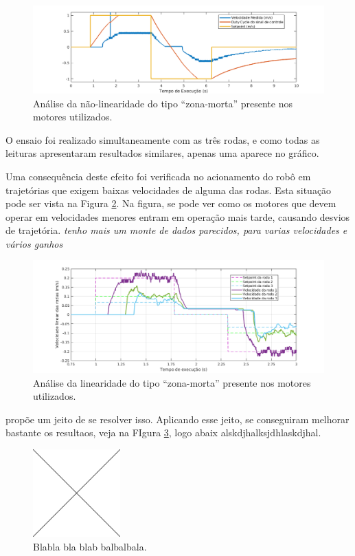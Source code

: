 \begin{figure}[h]
  \centering
  \includegraphics[width = \textwidth]{imagens/zonamorta}
  \caption{Análise da não-linearidade do tipo ``zona-morta'' presente nos motores utilizados.}
  \label{fig:zonamorta}
\end{figure}

O ensaio foi realizado simultaneamente com as três rodas, e como todas as leituras apresentaram resultados similares, apenas uma aparece no gráfico.

Uma consequência deste efeito foi verificada no acionamento do robô em trajetórias que exigem baixas velocidades de alguma das rodas. Esta situação pode ser vista na Figura \ref{fig:zm3rodas}. Na figura, se pode ver como os motores que devem operar em velocidades menores entram em operação mais tarde, causando desvios de trajetória. \textit{tenho mais um monte de dados parecidos, para varias velocidades e vários ganhos}

\begin{figure}[h]
  \centering
  \includegraphics[width = \textwidth]{imagens/zm3rodas}
  \caption{Análise da linearidade do tipo ``zona-morta'' presente nos motores utilizados.}
  \label{fig:zm3rodas}
\end{figure}


\cite{cunha2001zm} propõe um jeito de se resolver isso. Aplicando esse jeito, se conseguiram melhorar bastante os resultaos, veja na FIgura \ref{fig:zm_comp}, logo abaix alskdjhalksjdhlaskdjhal.

\begin{figure}[h]
  \centering
  \includegraphics[width = 0.3\textwidth]{imagens/edc}
  \caption{Blabla bla blab balbalbala.}
  \label{fig:zm_comp}
\end{figure}

